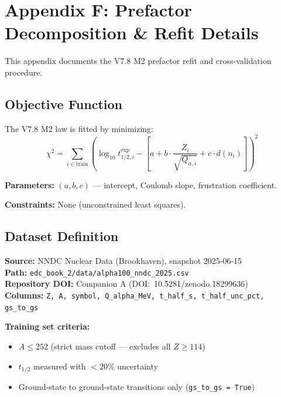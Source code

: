 \documentclass[11pt,a4paper]{article}
\begin{document}
\section{Appendix F: Prefactor Decomposition \& Refit Details}
\label{app:prefactor}

This appendix documents the V7.8 M2 prefactor refit and cross-validation procedure.

\subsection{Objective Function}

The V7.8 M2 law is fitted by minimizing:
\begin{equation}
    \chi^2 = \sum_{i \in \text{train}} \left( \log_{10} t_{1/2,i}^{\text{exp}} - \left[ a + b \cdot \frac{Z_i}{\sqrt{Q_{\alpha,i}}} + c \cdot d(n_i) \right] \right)^2
\end{equation}

\textbf{Parameters:} $(a, b, c)$ --- intercept, Coulomb slope, frustration coefficient.

\textbf{Constraints:} None (unconstrained least squares).

\subsection{Dataset Definition}

\begin{tcolorbox}[colback=blue!5!white,colframe=blue!50!black,title=Dataset Provenance (P1-1)]
\textbf{Source:} NNDC Nuclear Data (Brookhaven), snapshot 2025-06-15 \\
\textbf{Path:} \texttt{edc\_book\_2/data/alpha100\_nndc\_2025.csv} \\
\textbf{Repository DOI:} Companion A (DOI:~10.5281/zenodo.18299636) \\
\textbf{Columns:} \texttt{Z, A, symbol, Q\_alpha\_MeV, t\_half\_s, t\_half\_unc\_pct, gs\_to\_gs}
\end{tcolorbox}

\textbf{Training set criteria:}
\begin{itemize}[nosep]
    \item $A \leq 252$ (strict mass cutoff --- excludes all $Z \geq 114$)
    \item $t_{1/2}$ measured with $< 20\%$ uncertainty
    \item Ground-state to ground-state transitions only (\texttt{gs\_to\_gs = True})
\end{itemize}
\end{document}
